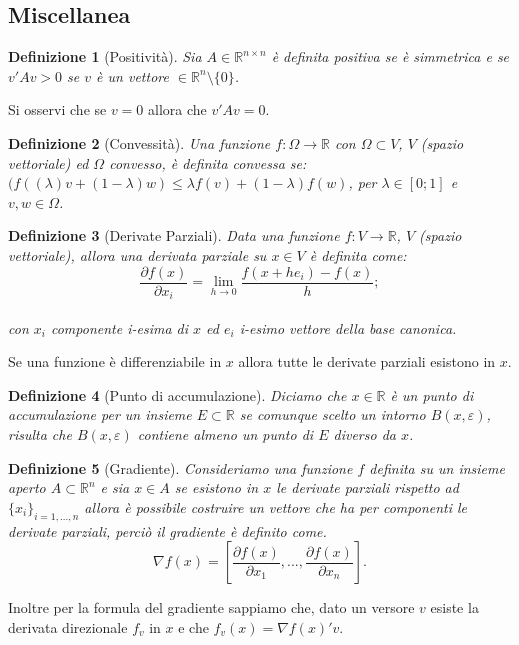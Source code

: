 \documentclass[a4paper, 12pt]{article}
\newtheorem{definition}{Definizione}
\begin{document}
\subsection{Miscellanea}
\begin{definition}[Positività]
Sia $A \in \mathbb{R}^{n \times n}$ è definita positiva se è simmetrica e se $v'Av > 0$ se $v$ è un vettore $\in \mathbb{R}^n \setminus \{0\}$.
\end{definition}
Si osservi che se $v = 0$ allora che $v'Av = 0$.
\begin{definition}[Convessità]
Una funzione $f:\Omega \to \mathbb{R}$ con $\Omega \subset V$, $V$ (spazio vettoriale) ed $\Omega$ convesso, è definita convessa se: $(f((\lambda)v + (1 - \lambda)w) \leq \lambda f(v) + (1 - \lambda)f(w)$, per $\lambda \in [0;1]$ e $v, w \in \Omega$.
\end{definition}
\begin{definition}[Derivate Parziali]
Data una funzione $f:V \to \mathbb{R}$, $V$ (spazio vettoriale), allora una derivata parziale su $x \in V$ è definita come:\\
\[\frac{\partial f(x)}{\partial x_i} = \lim_{h \to 0} \frac{f(x + h e_i) - f(x)}{h};\]\\ 
con $x_i$ componente i-esima di $x$ ed $e_i$ i-esimo vettore della base canonica.\\
\end{definition}
Se una funzione è differenziabile in $x$ allora tutte le derivate parziali esistono in $x$.
\begin{definition}[Punto di accumulazione]
Diciamo che $x \in \mathbb{R}$ è un punto di accumulazione per un insieme $E \subset \mathbb{R}$ se comunque scelto un intorno $B(x, \varepsilon)$, risulta che $B(x, \varepsilon)$ contiene almeno un punto di $E$ diverso da $x$.
\end{definition}
\begin{definition}[Gradiente]
Consideriamo una funzione $f$ definita su un insieme aperto $A \subset \mathbb{R}^n$ e sia $x \in A$ se esistono in $x$ le derivate parziali rispetto ad $\{x_i\}_{i=1, ..., n}$ allora è possibile costruire un vettore che ha per componenti le derivate parziali, perciò il gradiente è definito come.\\
\[\nabla f(x) = \left[\frac{\partial f(x)}{\partial x_1}, ..., \frac{\partial f(x)}{\partial x_n}\right].\]
\end{definition}
Inoltre per la formula del gradiente sappiamo che, dato un versore $v$ esiste la derivata direzionale $f_v$ in $x$ e che $f_v(x) = \nabla f(x)' v$.
\newpage



\end{document}
